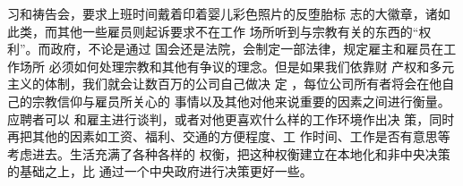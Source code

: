 \begin{paracol}{2}
习和祷告会，要求上班时间戴着印着婴儿彩色照片的反堕胎标
志的大徽章，诸如此类，而其他一些雇员则起诉要求不在工作
场所听到与宗教有关的东西的“权利”。而政府，不论是通过
国会还是法院，会制定一部法律，规定雇主和雇员在工作场所
必须如何处理宗教和其他有争议的理念。但是如果我们依靠财
产权和多元主义的体制，我们就会让数百万的公司自己做决
定 ，每位公司所有者将会在他自己的宗教信仰与雇员所关心的
事情以及其他对他来说重要的因素之间进行衡量。应聘者可以
和雇主进行谈判，或者对他更喜欢什么样的工作环境作出决
策，同时再把其他的因素如工资、福利、交通的方便程度、工
作时间、工作是否有意思等考虑进去。生活充满了各种各样的
权衡，把这种权衡建立在本地化和非中央决策的基础之上，比
通过一个中央政府进行决策更好一些。



\end{paracol}
